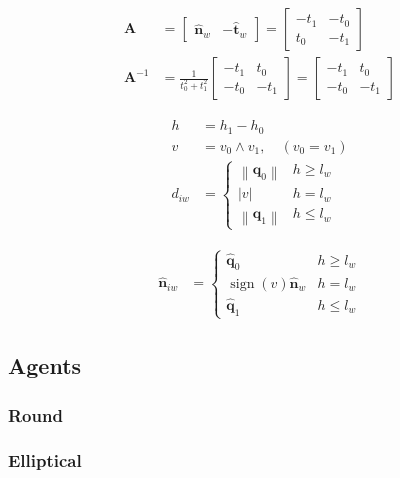 \begin{align}
\mathbf{A} 
&= \begin{bmatrix} \hat{\mathbf{n}}_{w} & -\hat{\mathbf{t}}_{w} \end{bmatrix} 
= \left[\begin{matrix}- t_{1} & - t_{0}\\t_{0} & - t_{1}\end{matrix}\right] \\
\mathbf{A}^{-1} 
&= \frac{1}{t_{0}^{2} + t_{1}^{2}} \left[\begin{matrix}- t_{1} & t_{0}\\- t_{0} & - t_{1}\end{matrix}\right]
= \left[\begin{matrix}- t_{1} & t_{0}\\- t_{0} & - t_{1}\end{matrix}\right]
\end{align}

\begin{align}
h &= h_{1} - h_{0} \\
v &= v_{0} \wedge v_{1},\quad (v_{0} = v_{1}) \\
d_{iw} &=
\begin{cases}
\left\|\mathbf{q}_{0}\right\| & h \geq l_{w} \\
\left|v\right| & h = l_{w} \\
\left\|\mathbf{q}_{1}\right\| & h \leq l_{w}
\end{cases}
\end{align}

\begin{align}
\hat{\mathbf{n}}_{iw} &=
\begin{cases}
\hat{\mathbf{q}}_{0} & h \geq l_{w} \\
\operatorname{sign}(v)\hat{\mathbf{n}}_{w} & h = l_{w} \\
\hat{\mathbf{q}}_{1} & h \leq l_{w}
\end{cases}
\end{align}



\subsection{Agents}
\subsubsection{Round}
\subsubsection{Elliptical}

